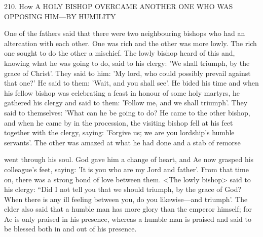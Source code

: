 210.
How A HOLY BISHOP OVERCAME ANOTHER ONE
WHO WAS OPPOSING HIM—BY HUMILITY

One of the fathers said that there were two neighbouring bishops
who had an altercation with each other.
One was rich and the other
was more lowly.
The rich one sought to do the other a mischief.
The lowly bishop heard of this and, knowing what he was going to
do, said to his clergy: 'We shall triumph, by the grace of Christ'.
They said to him: 'My lord, who could possibly prevail against that
one?' He said to them: 'Wait, and you shall see'.
He bided his time
and when his fellow bishop was celebrating a feast in honour of
some holy martyrs, he gathered his clergy and said to them: 'Follow
me, and we shall triumph'.
They said to themselves: 'What can he
be going to do? He came to the other bishop, and when he came by
in the procession, the visiting bishop fell at his feet together with the
clergy, saying: 'Forgive us; we are you lordship's humble servants'.
The other was amazed at what he had done and a stab of remorse

went through his soul.
God gave him a change of heart, and Ae now
grasped his colleague's feet, saying: 'It is you who are my Jord and
father'.
From that time on, there was a strong bond of love between
them.
<The lowly bishop> said to his clergy: “Did I not tell you that
we should triumph, by the grace of God? When there is any ill
feeling between you, do you likewise—and triumph'.
The elder also
said that a humble man has more glory than the emperor himself;
for Ae is only praised in his presence, whereas a humble man is
praised and said to be blessed both in and out of his presence.

